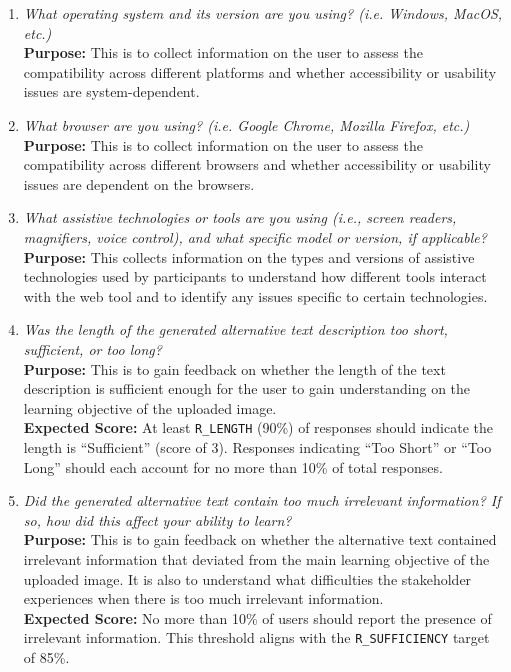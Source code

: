 \documentclass[12pt, titlepage]{article}
\begin{document}
\begin{enumerate}[label=UA-Q \arabic*., wide=0pt, leftmargin=*]
  \item \emph{What operating system and its version are you using?
    (i.e. Windows, MacOS, etc.)}\\[2mm]
    {\bf Purpose:} This is to collect information on the user to assess
    the compatibility across different platforms and
    whether accessibility or usability issues are system-dependent.

  \item \emph{What browser are you using? (i.e. Google Chrome, Mozilla
    Firefox, etc.)}\\[2mm]
    {\bf Purpose:} This is to collect information on the user to assess
    the compatibility across different browsers and
    whether accessibility or usability issues are dependent on the browsers.

  \item \emph{What assistive technologies or tools are you using (i.e.,
      screen readers, magnifiers, voice control), and what specific model
    or version, if applicable?}\\[2mm]
    {\bf Purpose:} This collects information on the types and versions
    of assistive technologies used by participants to understand how
    different tools interact with the web tool
    and to identify any issues specific to certain technologies.

  \item \emph{Was the length of the generated alternative text
    description too short, sufficient, or too long?}\\[2mm]
    {\bf Purpose:} This is to gain feedback on whether the length of
    the text description is sufficient enough
    for the user to gain understanding on the learning objective of the
    uploaded image.\\
    {\bf Expected Score:} At least \texttt{R\_LENGTH} (90\%) of responses should indicate the length is ``Sufficient'' (score of 3). Responses indicating ``Too Short'' or ``Too Long'' should each account for no more than 10\% of total responses.

  \item \emph{Did the generated alternative text contain too much
      irrelevant information? If so, how did this affect
    your ability to learn?}\\[2mm]
    {\bf Purpose:} This is to gain feedback on whether the alternative
    text contained irrelevant information that deviated
    from the main learning objective of the uploaded image. It is also
    to understand what difficulties the stakeholder experiences
    when there is too much irrelevant information.\\
    {\bf Expected Score:} No more than 10\% of users should report the presence of irrelevant information. This threshold aligns with the \texttt{R\_SUFFICIENCY} target of 85\%.


\end{enumerate}
\end{document}
